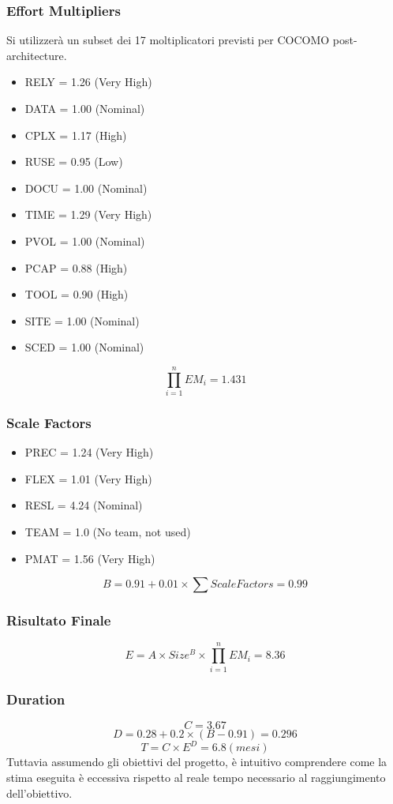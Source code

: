 \documentclass[11pt]{article}
\begin{document}
\subsubsection{Effort Multipliers}
Si utilizzerà un subset dei 17 moltiplicatori previsti per COCOMO post-architecture.
\begin{itemize}
	\item RELY = 1.26 (Very High)
	\item DATA = 1.00 (Nominal)
	\item CPLX = 1.17 (High)
	\item RUSE = 0.95 (Low)
	\item DOCU = 1.00 (Nominal)
	\item TIME = 1.29 (Very High)
	\item PVOL = 1.00 (Nominal)
	\item PCAP = 0.88 (High)
	\item TOOL = 0.90 (High)
	\item SITE = 1.00 (Nominal)
	\item SCED = 1.00 (Nominal)
\end{itemize}
	\[
		\prod_{i=1}^{n} EM_i = 1.431
	\]
\subsubsection{Scale Factors}
\begin{itemize}
	\item PREC = 1.24 (Very High)
	\item FLEX = 1.01 (Very High)
	\item RESL = 4.24 (Nominal)
	\item TEAM = 1.0 (No team, not used)
	\item PMAT = 1.56 (Very High)
\end{itemize}
   \[ B = 0.91 + 0.01 \times \sum Scale Factors = 0.99 \]
\subsubsection{Risultato Finale}
   \[ E = A \times Size^B \times \prod_{i=1}^{n} EM_i = 8.36 \]
\subsubsection{Duration}
   \[ C = 3.67 \]
   \[ D = 0.28 + 0.2 \times (B - 0.91) = 0.296 \]
   \[ T = C \times E^D = 6.8 (mesi) \]
   Tuttavia assumendo gli obiettivi del progetto, è intuitivo comprendere come la stima eseguita è eccessiva rispetto al reale tempo necessario al raggiungimento dell'obiettivo.
\end{document}
